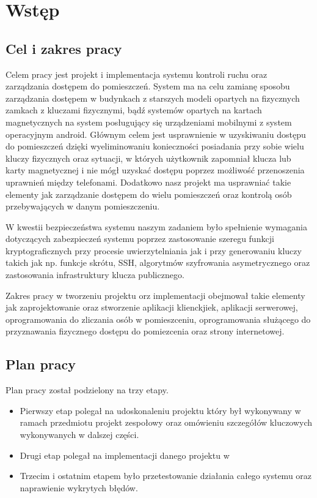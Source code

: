 \newpage\section{Wstęp}\label{sec:wstep}

\subsection{Cel i zakres pracy}

	Celem pracy jest projekt i implementacja systemu kontroli ruchu oraz zarządzania dostępem do pomieszczeń. System ma na celu zamianę sposobu zarządzania dostępem w budynkach z starszych modeli opartych na fizycznych zamkach z kluczami fizycznymi, bądź systemów opartych na kartach magnetycznych na system posługujący się urządzeniami mobilnymi z system operacyjnym android. Głównym celem jest usprawnienie w uzyskiwaniu dostępu do pomieszczeń dzięki wyeliminowaniu konieczności posiadania przy sobie wielu kluczy fizycznych oraz sytuacji, w których użytkownik zapomniał klucza lub karty magnetycznej i nie mógł uzyskać dostępu poprzez możliwość przenoszenia uprawnień między telefonami. Dodatkowo nasz projekt ma usprawniać takie elementy jak zarządzanie dostępem do wielu pomieszczeń oraz kontrolą osób przebywających w danym pomieszczeniu.
	
W kwestii bezpieczeństwa systemu naszym zadaniem było spełnienie wymagania dotyczących zabezpieczeń systemu poprzez zastosowanie szeregu funkcji kryptograficznych przy procesie uwierzytelniania jak i
przy generowaniu kluczy takich jak np. funkcje skrótu, SSH, algorytmów szyfrowania
asymetrycznego oraz zastosowania infrastruktury klucza publicznego.

Zakres pracy w tworzeniu projektu orz implementacji obejmował takie elementy jak zaprojektowanie oraz stworzenie aplikacji klienckjiek, aplikacji serwerowej, oprogramowania do zliczania osób w pomieszceniu, oprogramowania służącego do przyznawania fizycznego dostępu do pomiezcenia oraz strony internetowej.

\subsection{Plan pracy}
Plan pracy został podzielony na trzy etapy. 
\begin{itemize}
\item Pierwszy  etap polegał na udoskonaleniu projektu który był wykonywany w ramach przedmiotu projekt zespołowy  oraz omówieniu szczegółów kluczowych wykonywanych w dalszej części.

\item Drugi etap polegał na implementacji danego projektu w 

\item Trzecim i ostatnim etapem było przetestowanie  działania całego systemu oraz naprawienie wykrytych błędów.
\end{itemize}
